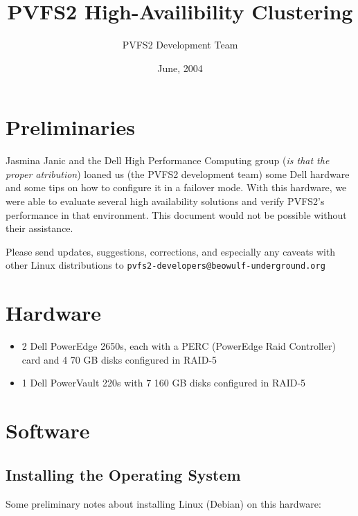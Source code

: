 \documentclass[11pt]{article}
\title{PVFS2 High-Availibility Clustering}
\author{PVFS2 Development Team}
\date{June, 2004}
\begin{document}
\maketitle


\section{Preliminaries}
Jasmina Janic and the Dell High Performance Computing group (\emph{is that
the proper atribution}) loaned us (the PVFS2 development team) some Dell
hardware and some tips on how to configure it in a failover mode.  With
this hardware, we were able to evaluate several high availability
solutions and verify PVFS2's performance in that environment.  This
document would not be possible without their assistance.

Please send updates, suggestions, corrections, and especially any
caveats with other Linux distributions to
\texttt{pvfs2-developers@beowulf-underground.org}

\section{Hardware}
\begin{itemize}
\item 2 Dell PowerEdge 2650s, 
	each with a PERC (PowerEdge Raid Controller) card
	and 4 70 GB disks configured in RAID-5
\item 1 Dell PowerVault 220s
	with 7 160 GB disks configured in RAID-5
\end{itemize}

\section{Software}
\subsection{Installing the Operating System}
Some preliminary notes about installing Linux (Debian) on this hardware:
\end{document}
